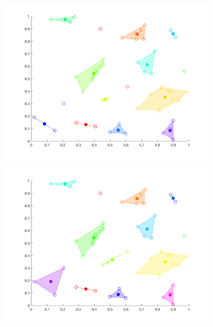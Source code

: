 \documentclass[12pt]{article}
\begin{document}
\begin{figure}[t!]
\begin{subfigure}[b]{0.3\textwidth}
    \end{subfigure}
    \begin{subfigure}[b]{0.3\textwidth}
        \includegraphics[width=\textwidth]{ha_6}
    \end{subfigure}
    \begin{subfigure}[b]{0.3\textwidth}
        \includegraphics[width=\textwidth]{ha_7}
    \end{subfigure}
    \begin{subfigure}[b]{0.3\textwidth}

\end{subfigure}
\end{figure}
\end{document}
